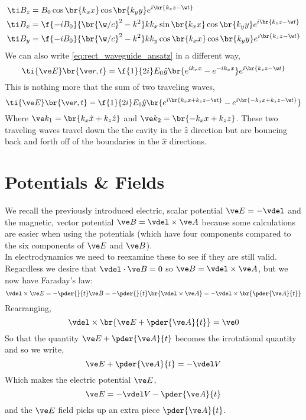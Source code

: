 \documentclass{article}
\begin{document}
\begin{align*}
\ti B_z &= B_0 \cos \br{k_x x} \cos\br{k_y y} e^{i\br{k_z z - \w t}} \\
\ti B_x &= \f{-iB_0}{\br{\w/c}^2 - k^2} k k_x \sin \br{k_x x} \cos\br{k_y y} e^{i\br{k_z z - \w t}} \\
\ti B_y &= \f{-iB_0}{\br{\w/c}^2 - k^2} k k_y \cos \br{k_x x} \cos\br{k_y y} e^{i\br{k_z z - \w t}}
\end{align*}
We can also write \cref{eq:rect_waveguide_ansatz} in a different way,
\[ \ti{\ve E}\br{\ve r, t} = \f{1}{2i} E_0 \hat y \br{e^{ik_x x} - e^{-ik_x x}} e^{i \br{k_z z - \w t}} \]
This is nothing more that the sum of two traveling waves,
\[ \ti{\ve E}\br{\ve r, t} = \f{1}{2i} E_0 \hat y \br{e^{i\br{k_x x + k_z z - \w t}} - e^{i\br{-k_x x + k_z z - \w t}}} \]
Where $\ve k_1 = \br{k_x \hat x + k_z \hat z}$ and $\ve k_2 = \br{- k_x x + k_z z}$. These two traveling waves travel down the the cavity in the $\hat z$ direction but are bouncing back and forth off of the boundaries in the $\hat x$ directions.

\section{Potentials \& Fields}
We recall the previously introduced electric, scalar potential $\ve E = - \vdel$ and the magnetic, vector potential $\ve B =\vdel \times\ve A$ because some calculations are easier when using the potentials (which have four components compared to the six components of $\ve E$ and $\ve B$). \\

In electrodynamics we need to reexamine these to see if they are still valid. Regardless we desire that $\vdel \cdot \ve B = 0$ so $\ve B = \vdel \times \ve A$, but we now have Faraday's law:
\[ \vdel \times \ve E = - \pder{}{t} \ve B = -\pder{}{t} \br{\vdel \times \ve A} = - \vdel \times \br{\pder{\ve A}{t}}\]
Rearranging,
\[ \vdel \times \br{\ve E + \pder{\ve A}{t}} = \ve 0 \]
So that the quantity $\ve E + \pder{\ve A}{t}$ becomes the irrotational quantity and so we write,
\[ \ve E + \pder{\ve A}{t} = - \vdel V \]
Which makes the electric potential $\ve E$,
\[ \ve E = - \vdel V - \pder{\ve A}{t} \]
and the $\ve E$ field picks up an extra piece $\pder{\ve A}{t}$. \\
\end{document}
